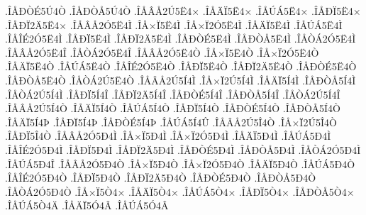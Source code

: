 {.^^ce^^c5^^d0^^d2^^c95^^da4^^d2
.^^ce^^c5^^d0^^d2^^c55^^da4^^d2
.^^ce^^c5^^c2^^c52^^da5^^cb4^^d7
.^^ce^^c5^^c4^^cf5^^cb4^^d7
.^^ce^^c5^^da^^c15^^cb4^^d7
.^^ce^^c5^^d0^^cf5^^cb4^^d7
.^^ce^^c5^^d0^^cf2^^c45^^cb4^^d7
.^^ce^^c5^^c2^^c52^^d35^^cb4^^cc
.^^ce^^c5^^d7^^cf5^^cb4^^cc
.^^ce^^c5^^d7^^cf2^^d35^^cb4^^cc
.^^ce^^c5^^c4^^cf5^^cb4^^cc
.^^ce^^c5^^da^^c15^^cb4^^cc
.^^ce^^c5^^ce^^c92^^d35^^cb4^^cc
.^^ce^^c5^^d0^^cf5^^cb4^^cc
.^^ce^^c5^^d0^^cf2^^c45^^cb4^^cc
.^^ce^^c5^^d0^^d2^^c95^^cb4^^cc
.^^ce^^c5^^d0^^d2^^c55^^cb4^^cc
.^^ce^^c5^^d2^^c12^^d35^^cb4^^cc
.^^ce^^c5^^c2^^c52^^d35^^cb4^^ce
.^^ce^^c5^^d2^^c12^^d35^^cb4^^ce
.^^ce^^c5^^c2^^c52^^d35^^cb4^^d2
.^^ce^^c5^^d7^^cf5^^cb4^^d2
.^^ce^^c5^^d7^^cf2^^d35^^cb4^^d2
.^^ce^^c5^^c4^^cf5^^cb4^^d2
.^^ce^^c5^^da^^c15^^cb4^^d2
.^^ce^^c5^^ce^^c92^^d35^^cb4^^d2
.^^ce^^c5^^d0^^cf5^^cb4^^d2
.^^ce^^c5^^d0^^cf2^^c45^^cb4^^d2
.^^ce^^c5^^d0^^d2^^c95^^cb4^^d2
.^^ce^^c5^^d0^^d2^^c55^^cb4^^d2
.^^ce^^c5^^d2^^c12^^da5^^cb4^^d2
.^^ce^^c5^^c2^^c52^^da5^^cd4^^cc
.^^ce^^c5^^d7^^cf2^^da5^^cd4^^cc
.^^ce^^c5^^c4^^cf5^^cd4^^cc
.^^ce^^c5^^d0^^d2^^c55^^cd4^^cc
.^^ce^^c5^^d2^^c12^^da5^^cd4^^cc
.^^ce^^c5^^d0^^cf5^^cd4^^ce
.^^ce^^c5^^d0^^cf2^^c45^^cd4^^ce
.^^ce^^c5^^d0^^d2^^c95^^cd4^^ce
.^^ce^^c5^^d0^^d2^^c55^^cd4^^ce
.^^ce^^c5^^d2^^c12^^da5^^cd4^^ce
.^^ce^^c5^^c2^^c52^^da5^^cd4^^d2
.^^ce^^c5^^c4^^cf5^^cd4^^d2
.^^ce^^c5^^da^^c15^^cd4^^d2
.^^ce^^c5^^d0^^cf5^^cd4^^d2
.^^ce^^c5^^d0^^d2^^c95^^cd4^^d2
.^^ce^^c5^^d0^^d2^^c55^^cd4^^d2
.^^ce^^c5^^c4^^cf5^^cd4^^de
.^^ce^^c5^^d0^^cf5^^cd4^^de
.^^ce^^c5^^d0^^d2^^c95^^cd4^^de
.^^ce^^c5^^da^^c15^^cd4^^db
.^^ce^^c5^^c2^^c52^^da5^^ce4^^d2
.^^ce^^c5^^d7^^cf2^^da5^^ce4^^d2
.^^ce^^c5^^d0^^cf5^^ce4^^d2
.^^ce^^c5^^c2^^c52^^d35^^d04^^cc
.^^ce^^c5^^d7^^cf5^^d04^^cc
.^^ce^^c5^^d7^^cf2^^d35^^d04^^cc
.^^ce^^c5^^c4^^cf5^^d04^^cc
.^^ce^^c5^^da^^c15^^d04^^cc
.^^ce^^c5^^ce^^c92^^d35^^d04^^cc
.^^ce^^c5^^d0^^cf5^^d04^^cc
.^^ce^^c5^^d0^^cf2^^c45^^d04^^cc
.^^ce^^c5^^d0^^d2^^c95^^d04^^cc
.^^ce^^c5^^d0^^d2^^c55^^d04^^cc
.^^ce^^c5^^d2^^c12^^d35^^d04^^cc
.^^ce^^c5^^da^^c15^^d04^^ce
.^^ce^^c5^^c2^^c52^^d35^^d04^^d2
.^^ce^^c5^^d7^^cf5^^d04^^d2
.^^ce^^c5^^d7^^cf2^^d35^^d04^^d2
.^^ce^^c5^^c4^^cf5^^d04^^d2
.^^ce^^c5^^da^^c15^^d04^^d2
.^^ce^^c5^^ce^^c92^^d35^^d04^^d2
.^^ce^^c5^^d0^^cf5^^d04^^d2
.^^ce^^c5^^d0^^cf2^^c45^^d04^^d2
.^^ce^^c5^^d0^^d2^^c95^^d04^^d2
.^^ce^^c5^^d0^^d2^^c55^^d04^^d2
.^^ce^^c5^^d2^^c12^^d35^^d04^^d2
.^^ce^^c5^^d7^^cf5^^d24^^d7
.^^ce^^c5^^c4^^cf5^^d24^^d7
.^^ce^^c5^^da^^c15^^d24^^d7
.^^ce^^c5^^d0^^cf5^^d24^^d7
.^^ce^^c5^^d0^^d2^^c55^^d24^^d7
.^^ce^^c5^^da^^c15^^d24^^c4
.^^ce^^c5^^c4^^cf5^^d34^^c2
.^^ce^^c5^^da^^c15^^d34^^c2
}
